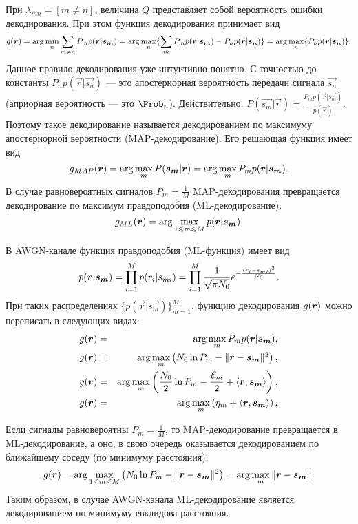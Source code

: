 \documentclass{book}
\numberwithin{theorem}{chapter}
\numberwithin{statement}{chapter}
\numberwithin{lemma}{chapter}
\theoremstyle{definition}
\numberwithin{task}{chapter}
\theoremstyle{remark}
\numberwithin{example}{chapter}
\theoremstyle{definition}
\numberwithin{definition}{chapter}
\theoremstyle{remark}
\theoremstyle{remark}
\numberwithin{lyrics}{section}
\begin{document}
При $\lambda_{mn} = [m \neq n]$, величина $Q$ представляет собой вероятность ошибки декодирования. При этом функция декодирования принимает вид
\begin{gather*}
g(\bm{r})  = 
\arg \min_{n} \sum\limits_{m \neq n} P_m p(\bm{r}|\bm{s_{m}}) = \arg \max_{n} \{\sum\limits_{m} P_m p(\bm{r}|\bm{s_{m}}) - P_n p(\bm{r}|\bm{s_{n}})\} = 
\arg \max_{n} \{P_n p(\bm{r}|\bm{s_{n}})\}.
\end{gather*}
Данное правило декодирования уже интуитивно понятно. С точностью до константы $P_n p(\vec{r}|\vec{s_{n}})$ --- это апостериорная вероятность передачи сигнала $\vec{s_{n}}$ (априорная вероятность --- это $\Prob_n$). Действительно, $P(\vec{s_m}|\vec{r}) = \frac{P_m p(\vec{r}|\vec{s_m})}{p(\vec{r})}$. Поэтому такое декодирование называется декодированием по максимуму апостериорной вероятности (MAP-декодирование). Его решающая функция имеет вид
\begin{equation}
\label{eq:phy:map_decoder}
g_{MAP}(\bm{r}) = \arg \max\limits_{m} P(\bm{s_m} | \bm{r}) = \arg \max\limits_{m} P_m p(\bm{r}|\bm{s_m}).
\end{equation}
В случае равновероятных сигналов $P_m = \frac{1}{M}$ MAP-декодирования превращается декодирование по максимум правдоподобия (ML-декодирование):
\begin{equation}
g_{ML}(\bm{r}) = \arg \max\limits_{1 \leqslant m \leqslant M} p(\bm{r}|\bm{s_m}).
\end{equation}

В AWGN-канале функция правдоподобия (ML-функция) имеет вид $$p(\bm{r}|\bm{s_m}) = \prod\limits_{i=1}^M p(r_i|s_{mi}) = \prod\limits_{i=1}^M \frac{1}{\sqrt{\pi N_0}} e^{-\frac{(r_i - s_{mi})^2}{N_0}}.$$
При таких распределениях $\{p(\vec{r}|\vec{s_m})\}_{m=1}^M$, функцию декодирования $g(\bm{r})$ можно переписать в следующих видах:
\begin{eqnarray*}
	g(\bm{r}) &=& \arg \max\limits_{m} P_m p(\boldsymbol{r}|\boldsymbol{s_m}),\\
	g(\bm{r}) &=& \arg \max\limits_{m} \left(N_0\ln P_m - \|\boldsymbol{r}-\boldsymbol{s_m}\|^2\right), \\
	g(\bm{r}) &=& \arg \max\limits_{m} \left(\frac{N_0}{2}\ln P_m - \frac{\mathcal{E}_m}{2} + \langle \boldsymbol{r}, \boldsymbol{s_m} \rangle \right), \\
	g(\bm{r}) &=& \arg \max\limits_{m} \left(\eta_m + \langle \boldsymbol{r}, \boldsymbol{s_m} \rangle \right),
\end{eqnarray*}

Если сигналы равновероятны $P_m = \frac{1}{M}$, то MAP-декодирование превращается в ML-декодирование, а оно, в свою очередь оказывается декодированием по ближайшему соседу (по минимуму расстояния):
\begin{equation}
\notag
g(\bm{r}) = \arg \max\limits_{1 \leq m \leq M} \left(N_0\ln P_m - \|\bm{r}-\bm{s_m}\|^2\right) = 
\arg \max\limits_{m} \|\bm{r}-\bm{s_m}\|.
\end{equation}
Таким образом, в случае AWGN-канала ML-декодирование является декодированием по минимуму евклидова расстояния.
\end{document}
